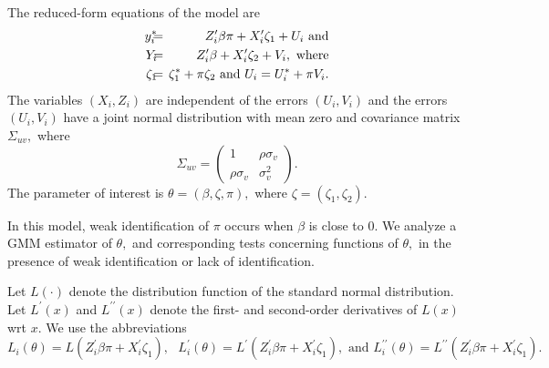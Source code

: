 \documentclass[12pt,titlepage,final,oneside,letterpaper]{article}
\begin{document}
The reduced-form equations of the model are%
\begin{eqnarray}
y_{i}^{\ast }\hspace{-0.08in} &=&\hspace{-0.08in}Z_{i}^{\prime }\beta \pi
+X_{i}^{\prime }\zeta _{1}+U_{i}\text{ and}  \notag \\
Y_{i}\hspace{-0.08in} &=&\hspace{-0.08in}Z_{i}^{\prime }\beta +X_{i}^{\prime
}\zeta _{2}+V_{i},\text{ where}  \notag \\
\zeta _{1}\hspace{-0.08in} &=&\hspace{-0.08in}\zeta _{1}^{\ast }+\pi \zeta
_{2}\text{ and }U_{i}=U_{i}^{\ast }+\pi V_{i}.  \label{Probit-red eqns}
\end{eqnarray}%
The variables $(X_{i},Z_{i})$ are independent of the errors $(U_{i},V_{i})$
and the errors $(U_{i},V_{i})$ have a joint normal distribution with mean
zero and covariance matrix $\Sigma _{uv},$ where%
\begin{equation}
\Sigma _{uv}=\left( 
\begin{array}{cc}
1 & \rho \sigma _{v} \\ 
\rho \sigma _{v} & \sigma _{v}^{2}%
\end{array}%
\right) .
\end{equation}%
The parameter of interest is $\theta =(\beta ,\zeta ,\pi ),$ where $\zeta
=(\zeta _{1},\zeta _{2}).$

In this model, weak identification of $\pi $ occurs when $\beta $ is close
to $0.$ We analyze a GMM estimator of $\theta ,$ and corresponding tests
concerning functions of $\theta ,$ in the presence of weak identification or
lack of identification.

Let $L(\cdot )$ denote the distribution function of the standard normal
distribution. Let $L^{\prime }(x)$ and $L^{\prime \prime }(x)$ denote the
first- and second-order derivatives of $L(x)$ wrt $x.$ We use the
abbreviations 
\begin{equation}
L_{i}(\theta )=L(Z_{i}^{\prime }\beta \pi +X_{i}^{\prime }\zeta _{1}),\text{ 
}L_{i}^{\prime }(\theta )=L^{\prime }(Z_{i}^{\prime }\beta \pi
+X_{i}^{\prime }\zeta _{1}),\text{ and }L_{i}^{\prime \prime }(\theta
)=L^{\prime \prime }(Z_{i}^{\prime }\beta \pi +X_{i}^{\prime }\zeta _{1}).
\end{equation}
\end{document}
